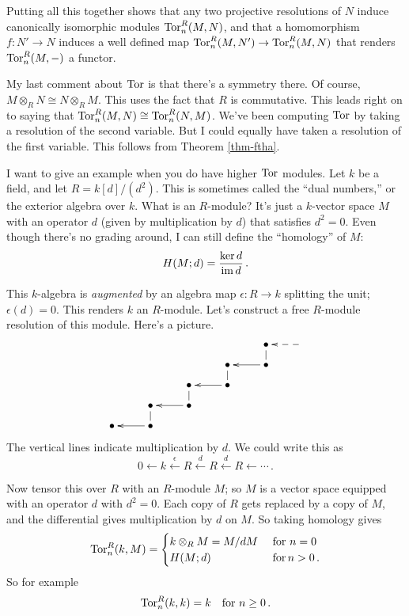 Putting all this together shows that any two projective resolutions of $N$ 
induce canonically isomorphic modules $\operatorname{Tor}_n^R(M,N)$, and that a homomorphism
$f:N'\to N$ induces a well defined map $\operatorname{Tor}_n^R(M,N')\to\operatorname{Tor}_n^R(M,N)$
that renders $\operatorname{Tor}^R_n(M,-)$ a functor. 

My 
last comment about $\operatorname{Tor}$ is that there's a symmetry there. Of course, $M\otimes_R N\cong N\otimes_R M$. This uses the fact that $R$ is commutative. This leads right on to saying that $\operatorname{Tor}^R_n(M,N)\cong \operatorname{Tor}^R_n(N,M)$. We've been computing $\operatorname{Tor}$ by taking a resolution of the second variable. But I could equally have taken a resolution of the first variable. This follows from Theorem
\ref{thm-ftha}.


\begin{example}
I want to give an example when you do have higher $\operatorname{Tor}$ modules. Let $k$ be a field, and let $R=k[d]/(d^2)$. This is sometimes called the ``dual numbers,'' or the exterior algebra over $k$. 
What is an $R$-module? It's just a $k$-vector space $M$ with an operator $d$ (given by multiplication by $d$) that satisfies $d^2=0$. Even though there's no grading around, I can still define the ``homology'' of $M$:
\[
H(M;d)=\frac{\ker d}{\operatorname{im} d}\,.
\]

This $k$-algebra is {\em augmented} by an algebra map $\epsilon:R\to k$ splitting the unit; $\epsilon(d)=0$. This renders $k$ an $R$-module. Let's construct a free $R$-module resolution of this module. Here's a picture.
\[
\xymatrix@R=8pt{
&&&& \bullet \ar@{<--}[r] \ar@{-}[d] & \\
&&& \bullet \ar@{-}[d] & \bullet \ar[l]  \\
&& \bullet \ar@{-}[d] & \bullet \ar[l] \\
& \bullet \ar@{-}[d] & \bullet \ar[l] \\
\bullet & \bullet \ar[l]
}\]
The vertical lines indicate multiplication by $d$. We could write this as
\[
0\leftarrow 
k\xleftarrow{\epsilon}R\xleftarrow{d}R\xleftarrow{d}R\leftarrow\cdots\,.
\]

Now tensor this over $R$ with an $R$-module $M$; so $M$ is a vector space 
equipped with an operator $d$ with $d^2=0$. Each copy of $R$ gets replaced by
a copy of $M$, and the differential gives multiplication by $d$ on $M$. So 
taking homology gives 
\[
\operatorname{Tor}^R_n(k,M)=
\begin{cases}k\otimes_RM=M/dM\,&\,\hbox{for}\,\,n=0\\
H(M;d)\,&\,\hbox{for}\,n>0\,.
\end{cases}
\]
So for example 
\[
\operatorname{Tor}^R_n(k,k)=k\quad\hbox{for}\,\,n\geq0\,.
\]
\end{example}

